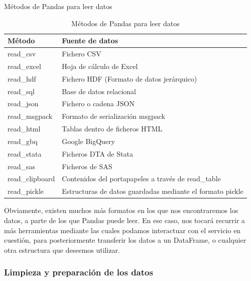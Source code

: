 \begin{table}[h!]
\centering
\caption{Métodos de Pandas para leer datos}
\label{pandas_readData}
\begin{tabular}{|l|l|}
\hline
\textbf{Método} & \textbf{Fuente de datos}                                  \\ \hline
read\_csv       & Fichero CSV                                               \\ \hline
read\_excel     & Hoja de cálculo de Excel                                  \\ \hline
read\_hdf       & Fichero HDF (Formato de datos jerárquico)                 \\ \hline
read\_sql       & Base de datos relacional                                  \\ \hline
read\_json      & Fichero o cadena JSON                                     \\ \hline
read\_msgpack   & Formato de serialización msgpack                          \\ \hline
read\_html      & Tablas dentro de ficheros HTML                            \\ \hline
read\_gbq       & Google BigQuery                                           \\ \hline
read\_stata     & Ficheros DTA de Stata                                     \\ \hline
read\_sas       & Ficheros de SAS                                           \\ \hline
read\_clipboard & Contenidos del portapapeles a través de read\_table       \\ \hline
read\_pickle    & Estructuras de datos guardadas mediante el formato pickle \\ \hline
\end{tabular}
\caption{Métodos de Pandas para leer datos}
\end{table}

Obviamente, existen muchos más formatos en los que nos encontraremos los datos,
a parte de los que Pandas puede leer. En ese caso, nos tocará recurrir a más
herramientas mediante las cuales podamos interactuar con el servicio en
cuestión, para posteriormente transferir los datos a un DataFrame, o cualquier
otra estructura que deseemos utilizar.


\subsubsection{Limpieza y preparación de los datos}
\label{subsec:state_dataScience_workflow_1}

